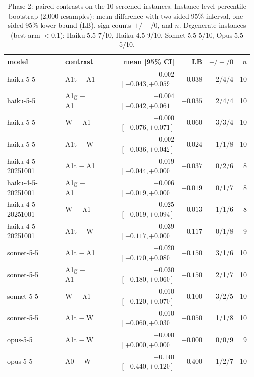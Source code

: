 \begin{table}[t]\centering\small
\caption{Phase 2: paired contrasts on the 10 screened instances. Instance-level percentile bootstrap (2{,}000 resamples): mean difference with two-sided 95\% interval, one-sided 95\% lower bound (LB), sign counts $+/-/0$, and $n$. Degenerate instances (best arm $<0.1$): Haiku 5.5 7/10, Haiku 4.5 9/10, Sonnet 5.5 5/10, Opus 5.5 5/10.}\label{tab:p2con}
\begin{tabular}{llrrrr}\toprule
model & contrast & mean [95\% CI] & LB & $+/-/0$ & $n$\\\midrule
haiku-5-5 & A1t $-$ A1 & $+0.002$ $[-0.043, +0.059]$ & $-0.038$ & 2/4/4 & 10\\
haiku-5-5 & A1g $-$ A1 & $+0.004$ $[-0.042, +0.061]$ & $-0.035$ & 2/4/4 & 10\\
haiku-5-5 & W $-$ A1 & $+0.000$ $[-0.076, +0.071]$ & $-0.060$ & 3/3/4 & 10\\
haiku-5-5 & A1t $-$ W & $+0.002$ $[-0.036, +0.042]$ & $-0.024$ & 1/1/8 & 10\\
haiku-4-5-20251001 & A1t $-$ A1 & $-0.019$ $[-0.044, +0.000]$ & $-0.037$ & 0/2/6 & 8\\
haiku-4-5-20251001 & A1g $-$ A1 & $-0.006$ $[-0.019, +0.000]$ & $-0.019$ & 0/1/7 & 8\\
haiku-4-5-20251001 & W $-$ A1 & $+0.025$ $[-0.019, +0.094]$ & $-0.013$ & 1/1/6 & 8\\
haiku-4-5-20251001 & A1t $-$ W & $-0.039$ $[-0.117, +0.000]$ & $-0.117$ & 0/1/8 & 9\\
sonnet-5-5 & A1t $-$ A1 & $-0.020$ $[-0.170, +0.080]$ & $-0.150$ & 3/1/6 & 10\\
sonnet-5-5 & A1g $-$ A1 & $-0.030$ $[-0.180, +0.060]$ & $-0.150$ & 2/1/7 & 10\\
sonnet-5-5 & W $-$ A1 & $-0.010$ $[-0.120, +0.070]$ & $-0.100$ & 3/2/5 & 10\\
sonnet-5-5 & A1t $-$ W & $-0.010$ $[-0.060, +0.030]$ & $-0.050$ & 1/1/8 & 10\\
opus-5-5 & A1t $-$ W & $+0.000$ $[+0.000, +0.000]$ & $+0.000$ & 0/0/9 & 9\\
opus-5-5 & A0 $-$ W & $-0.140$ $[-0.440, +0.120]$ & $-0.400$ & 1/2/7 & 10\\
\bottomrule\end{tabular}\end{table}

